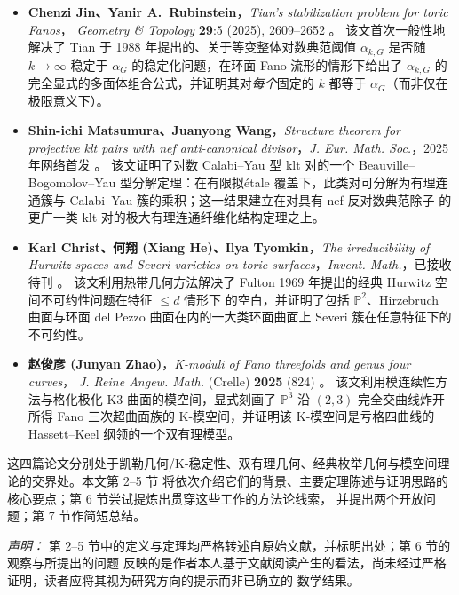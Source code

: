 \documentclass[11pt,a4paper]{article}
\theoremstyle{definition}
\theoremstyle{remark}
\newcommand{\PP}{\mathbb{P}}
\begin{document}
\begin{itemize}[leftmargin=1.6em]
  \item \textbf{Chenzi Jin、Yanir A.\ Rubinstein}，\emph{Tian's stabilization problem for toric Fanos}，
  \emph{Geometry \& Topology} \textbf{29}:5 (2025), 2609--2652 \cite{JR2025}。
  该文首次一般性地解决了 Tian 于 1988 年提出的、关于等变整体对数典范阈值 $\alpha_{k,G}$ 是否随
  $k\to\infty$ 稳定于 $\alpha_G$ 的稳定化问题，在环面 Fano 流形的情形下给出了 $\alpha_{k,G}$ 的
  完全显式的多面体组合公式，并证明其对\emph{每个}固定的 $k$ 都等于 $\alpha_G$（而非仅在极限意义下）。

  \item \textbf{Shin-ichi Matsumura、Juanyong Wang}，\emph{Structure theorem for projective klt pairs
  with nef anti-canonical divisor}，\emph{J. Eur. Math. Soc.}，2025 年网络首发 \cite{MW2025}。
  该文证明了对数 Calabi--Yau 型 klt 对的一个 Beauville--Bogomolov--Yau 型分解定理：在有限拟étale
  覆盖下，此类对可分解为有理连通簇与 Calabi--Yau 簇的乘积；这一结果建立在对具有 nef 反对数典范除子
  的更广一类 klt 对的极大有理连通纤维化结构定理之上。

  \item \textbf{Karl Christ、何翔 (Xiang He)、Ilya Tyomkin}，\emph{The irreducibility of Hurwitz spaces
  and Severi varieties on toric surfaces}，\emph{Invent. Math.}，已接收待刊 \cite{CHT2026}。
  该文利用热带几何方法解决了 Fulton 1969 年提出的经典 Hurwitz 空间不可约性问题在特征 $\le d$ 情形下
  的空白，并证明了包括 $\PP^2$、Hirzebruch 曲面与环面 del Pezzo 曲面在内的一大类环面曲面上 Severi
  簇在任意特征下的不可约性。

  \item \textbf{赵俊彦 (Junyan Zhao)}，\emph{K-moduli of Fano threefolds and genus four curves}，
  \emph{J. Reine Angew. Math.} (Crelle) \textbf{2025} (824) \cite{Zhao2025}。
  该文利用模连续性方法与格化极化 K3 曲面的模空间，显式刻画了 $\PP^3$ 沿 $(2,3)$-完全交曲线炸开所得
  Fano 三次超曲面族的 K-模空间，并证明该 K-模空间是亏格四曲线的 Hassett--Keel 纲领的一个双有理模型。
\end{itemize}

这四篇论文分别处于凯勒几何/K-稳定性、双有理几何、经典枚举几何与模空间理论的交界处。本文第 2--5 节
将依次介绍它们的背景、主要定理陈述与证明思路的核心要点；第 6 节尝试提炼出贯穿这些工作的方法论线索，
并提出两个开放问题；第 7 节作简短总结。

\emph{声明：} 第 2--5 节中的定义与定理均严格转述自原始文献，并标明出处；第 6 节的观察与所提出的问题
反映的是作者本人基于文献阅读产生的看法，尚未经过严格证明，读者应将其视为研究方向的提示而非已确立的
数学结果。
\end{document}
